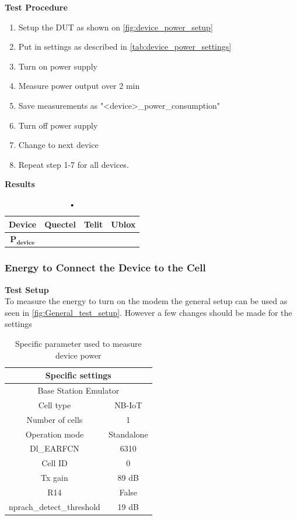 \textbf{Test Procedure}\\
\begin{enumerate}
\item Setup the \gls{DUT} as shown on \autoref{fig:device_power_setup}
\item Put in settings as described in \autoref{tab:device_power_settings} 
\item Turn on power supply 
\item Measure power output over 2 min
\item Save measurements as "<device>\_power\_consumption"
\item Turn off power supply
\item Change to next device
\item Repeat step 1-7 for all devices.
\end{enumerate}

\textbf{Results}\\
\begin{table}[H]
\centering
\begin{tabular}{|c|c|c|c|}\hline
\textbf{Device}	& Quectel	& Telit & Ublox \\ \hline
$\mathbf{P_{device}}$	& & & \\ \hline
\end{tabular}
\caption{•}
\label{tab:device_power_results}
\end{table}

\subsubsection{Energy to Connect the Device to the Cell}
\textbf{Test Setup}\\
To measure the energy to turn on the modem the general setup can be used as seen in \autoref{fig:General_test_setup}. However a few changes should be made for the settings

\begin{table}[H]
\centering
\begin{tabular}{|c|c|} \hline
\multicolumn{2}{|c|}{\textbf{Specific settings}} \\ \hline
\multicolumn{2}{|c|}{Base Station Emulator} \\ \hline
Cell type          & NB-IoT         \\ \hline
Number of cells    & 1              \\ \hline
Operation mode     & Standalone     \\ \hline
Dl\_EARFCN         & 6310           \\ \hline
Cell ID            & 0              \\ \hline
Tx gain            & 89 dB          \\ \hline
R14                & False          \\ \hline
nprach\_detect\_threshold  & 19 dB  \\ \hline
\end{tabular}
\caption{Specific parameter used to measure device power}
\label{tab:E_on_settings}
\end{table}


